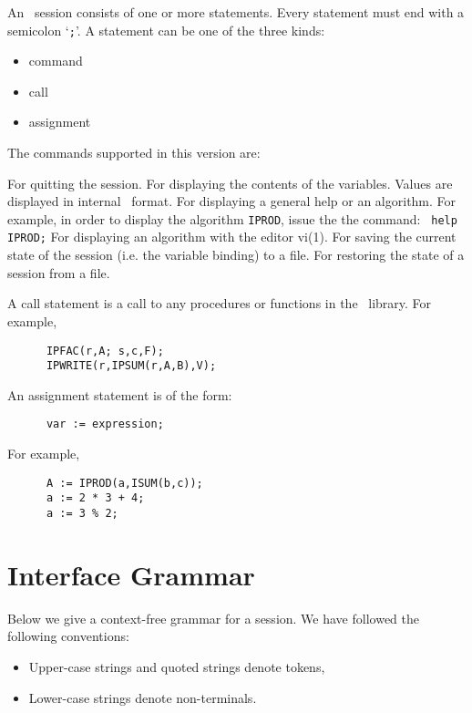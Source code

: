 An \isac\ session consists of one or more statements.
Every statement must end with a semicolon `\verb:;:'.
A statement can be one of the three kinds:
\begin{itemize}
\item     command
\item     call
\item     assignment
\end{itemize}
%
The commands supported in this version are:
\begin{glists}{3em}{10em}{1em}{1ex}
               For quitting the session.
               For displaying the contents of the variables.
			    Values are displayed in internal \saclib\ format.
     For displaying a general help or an algorithm.
                            For example, in order to display the algorithm
                            \mbox{\tt IPROD}, issue the the command:
                            \verb: help IPROD;:
	    For displaying an algorithm with the editor vi(1).
	    For saving the current state of the session 
			    (i.e. the variable binding) to a file.
   For restoring the state of a session from a file.
\end{glists}
%
A call statement is a call to any procedures or functions in the \saclib\
library.  For example,
\begin{verbatim}
      IPFAC(r,A; s,c,F);
      IPWRITE(r,IPSUM(r,A,B),V);
\end{verbatim}
%
An assignment statement is of the form:  
\begin{verbatim}
      var := expression;
\end{verbatim}
%
For example,
\begin{verbatim}
      A := IPROD(a,ISUM(b,c));
      a := 2 * 3 + 4;
      a := 3 % 2;
\end{verbatim}


\section{Interface Grammar}
Below we give a context-free grammar for a session.
We have followed the following conventions: 
\begin{itemize}
\item  Upper-case strings and quoted strings denote tokens,
\item  Lower-case strings denote non-terminals.
\end{itemize}

